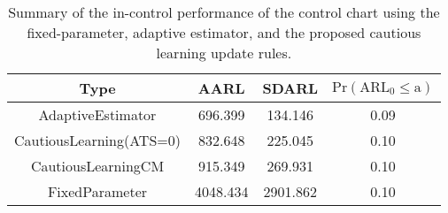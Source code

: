 \begin{table}[!h]

\caption{Summary of the in-control performance of the control chart using the fixed-parameter, adaptive estimator, and the proposed cautious learning update rules.}
\centering
\begin{tabular}[t]{cccc}
\toprule
Type & AARL & SDARL & $\text{Pr}(\text{ARL}_0 \leq \text{a})$\\
\midrule
AdaptiveEstimator & 696.399 & 134.146 & 0.09\\
CautiousLearning(ATS=0) & 832.648 & 225.045 & 0.10\\
CautiousLearningCM & 915.349 & 269.931 & 0.10\\
FixedParameter & 4048.434 & 2901.862 & 0.10\\
\bottomrule
\end{tabular}
\end{table}
